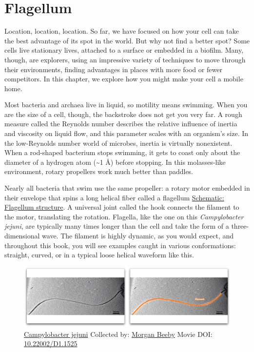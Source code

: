 \documentclass[]{tufte-book}
\begin{document}
\section{Flagellum}\label{flagellum}

Location, location, location. So far, we have focused on how your cell
can take the best advantage of its spot in the world. But why not find a
better spot? Some cells live stationary lives, attached to a surface or
embedded in a biofilm. Many, though, are explorers, using an impressive
variety of techniques to move through their environments, finding
advantages in places with more food or fewer competitors. In this
chapter, we explore how you might make your cell a mobile home.

Most bacteria and archaea live in liquid, so motility means swimming.
When you are the size of a cell, though, the backstroke does not get you
very far. A rough measure called the Reynolds number describes the
relative influence of inertia and viscosity on liquid flow, and this
parameter scales with an organism's size. In the low-Reynolds number
world of microbes, inertia is virtually nonexistent. When a rod-shaped
bacterium stops swimming, it gets to coast only about the diameter of a
hydrogen atom (\textasciitilde{}1 Å) before stopping. In this
molasses-like environment, rotary propellers work much better than
paddles.

Nearly all bacteria that swim use the same propeller: a rotary motor
embedded in their envelope that spins a long helical fiber called a
flagellum \protect\hyperlink{Flagellum_structure}{Schematic: Flagellum
structure}. A universal joint called the hook connects the filament to
the motor, translating the rotation. Flagella, like the one on this
\emph{Campylobacter jejuni}, are typically many times longer than the
cell and take the form of a three-dimensional wave. The filament is
highly dynamic, as you would expect, and throughout this book, you will
see examples caught in various conformations: straight, curved, or in a
typical loose helical waveform like this.





\begin{figure}
\includegraphics{movie_stills/6_1} \caption[\protect\hyperlink{tree}{Campylobacter jejuni} Collected by:
\protect\hyperlink{morgan_beeby}{Morgan Beeby} Movie DOI:
\href{https://doi.org/10.22002/D1.1525}{10.22002/D1.1525}]{\protect\hyperlink{tree}{Campylobacter jejuni} Collected by:
\protect\hyperlink{morgan_beeby}{Morgan Beeby} Movie DOI:
\href{https://doi.org/10.22002/D1.1525}{10.22002/D1.1525}}\label{fig:6-1}
\end{figure}
\end{document}
